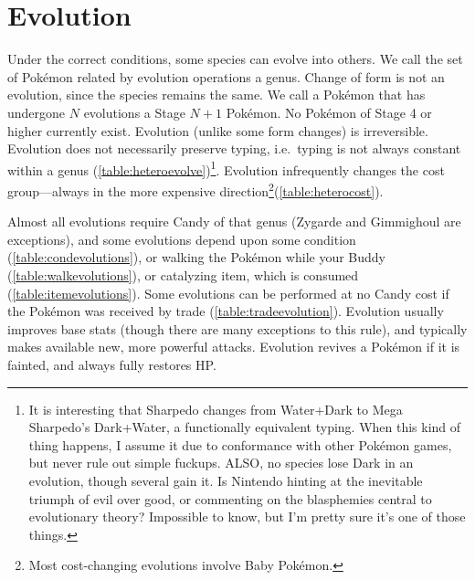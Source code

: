 \section{Evolution}
\label{sec:evolution}
Under the correct conditions, some species can evolve into others.
We call the set of Pokémon related by evolution operations a genus.
Change of form is not an evolution, since the species remains the same.
We call a Pokémon that has undergone $N$ evolutions a Stage $N+1$ Pokémon.
No Pokémon of Stage 4 or higher currently exist.
Evolution (unlike some form changes) is irreversible.
Evolution does not necessarily preserve typing, i.e.\ typing is not always constant within a genus (\autoref{table:heteroevolve})\footnote{It is interesting
  that Sharpedo changes from Water+Dark to Mega Sharpedo's Dark+Water,
  a functionally equivalent typing. When this kind of thing happens,
  I assume it due to conformance with other Pokémon games, but never
  rule out simple fuckups. ALSO, no species lose Dark in an evolution,
  though several gain it. Is Nintendo hinting at the inevitable triumph of
  evil over good, or commenting on the blasphemies central to evolutionary theory?
  Impossible to know, but I'm pretty sure it's one of those things.}.
Evolution infrequently changes the cost group---always in the more expensive direction\footnote{Most
  cost-changing evolutions involve Baby Pokémon.}(\autoref{table:heterocost}).

Almost all evolutions require Candy of that genus (Zygarde and Gimmighoul are exceptions),
  and some evolutions depend upon some condition (\autoref{table:condevolutions}),
  or walking the Pokémon while your Buddy (\autoref{table:walkevolutions}),
  or catalyzing item, which is consumed (\autoref{table:itemevolutions}).
Some evolutions can be performed at no Candy cost if the Pokémon was received by trade
 (\autoref{table:tradeevolution}).
Evolution usually improves base stats (though there are many exceptions to this rule),
  and typically makes available new, more powerful attacks.
Evolution revives a Pokémon if it is fainted, and always fully restores HP\@.
